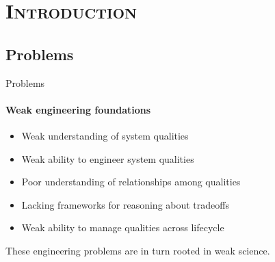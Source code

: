 \documentclass[xcolor=x11names,compress]{beamer}
\renewcommand{\(}{\begin{columns}}
\renewcommand{\)}{\end{columns}}
\newcommand{\<}[1]{\begin{column}{#1}}
\renewcommand{\>}{\end{column}}
\begin{document}


\section{\scshape Introduction}
\subsection{Problems}
\begin{frame}{Problems}
\framesubtitle{Weak engineering foundations}
\begin{itemize}
\item Weak understanding of system qualities
\item Weak ability to engineer system qualities
\item Poor understanding of relationships among qualities
\item Lacking frameworks for reasoning about tradeoffs
\item Weak ability to manage  qualities across lifecycle
\end{itemize}
\vspace{0.5cm}
These engineering problems are in turn rooted in weak science.
\end{frame}
\end{document}
